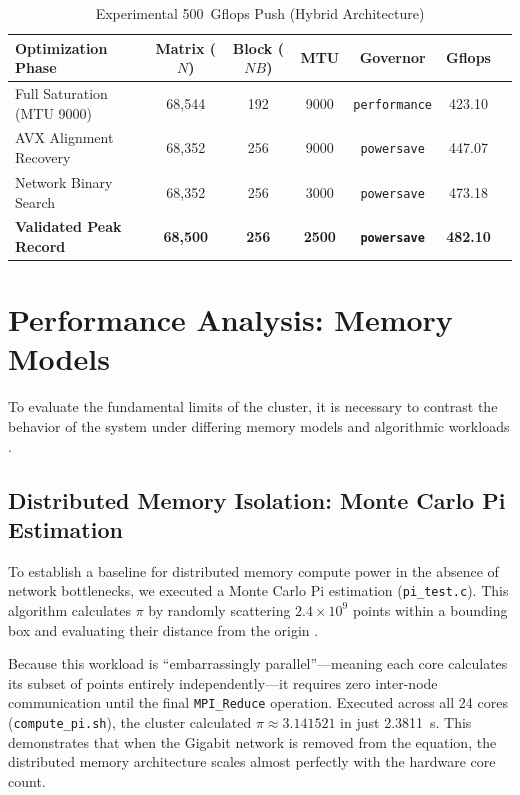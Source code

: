 \documentclass[11pt]{article}
\begin{document}
\begin{table}[H]
  \centering
  \caption{Experimental \SI{500}{Gflops} Push (Hybrid Architecture)}
  \label{tab:experimental_push}
  \begin{tabular}{lcccccc}
    \toprule
    \textbf{Optimization Phase} & \textbf{Matrix ($N$)} & \textbf{Block ($NB$)} & \textbf{MTU} & \textbf{Governor} & \textbf{Gflops} \\
    \midrule
    Full Saturation (MTU 9000) & 68,544 & 192 & 9000 & \texttt{performance} & 423.10 \\
    AVX Alignment Recovery     & 68,352 & 256 & 9000 & \texttt{powersave} & 447.07 \\
    Network Binary Search      & 68,352 & 256 & 3000 & \texttt{powersave} & 473.18 \\
    \textbf{Validated Peak Record} & \textbf{68,500} & \textbf{256} & \textbf{2500} & \textbf{\texttt{powersave}} & \textbf{482.10} \\
    \bottomrule
  \end{tabular}
\end{table}

\section{Performance Analysis: Memory Models}
To evaluate the fundamental limits of the cluster, it is necessary to contrast the behavior of the system under differing memory models and algorithmic workloads .

\subsection{Distributed Memory Isolation: Monte Carlo Pi Estimation}
To establish a baseline for distributed memory compute power in the absence of network bottlenecks, we executed a Monte Carlo Pi estimation (\texttt{pi\_test.c}). This algorithm calculates $\pi$ by randomly scattering $2.4 \times 10^9$ points within a bounding box and evaluating their distance from the origin .

Because this workload is ``embarrassingly parallel''—meaning each core calculates its subset of points entirely independently—it requires zero inter-node communication until the final \texttt{MPI\_Reduce} operation. Executed across all 24 cores (\texttt{compute\_pi.sh}), the cluster calculated $\pi \approx 3.141521$ in just \SI{2.3811}{\second}. This demonstrates that when the Gigabit network is removed from the equation, the distributed memory architecture scales almost perfectly with the hardware core count.
\end{document}
